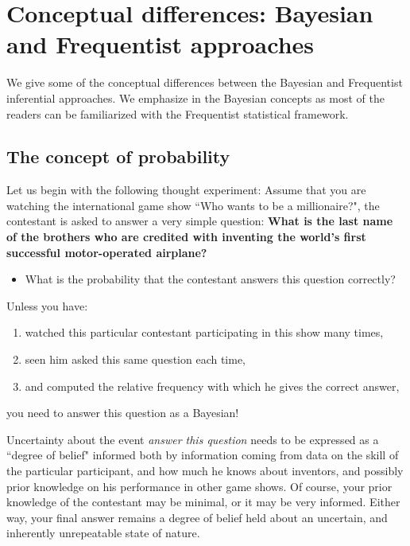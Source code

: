 \chapter{Conceptual differences: Bayesian and Frequentist approaches}\label{chap2}

We give some of the conceptual differences between the Bayesian and Frequentist inferential approaches. We emphasize in the Bayesian concepts as most of the readers can be familiarized with the Frequentist statistical framework.

\section{The concept of probability}\label{sec21}

Let us begin with the following thought experiment: Assume that you are watching the international game show ``Who wants to be a millionaire?", the contestant is asked to answer a very simple question: \textbf{What is the last name of the brothers who are credited with inventing  the world's first successful motor-operated airplane?}

\begin{itemize}
	\item What is the probability that the contestant answers this question correctly? 
\end{itemize}

Unless you have: 

\begin{enumerate}
	\item  watched this particular contestant participating in this show many times,
	\item seen him asked this same question each time, 
	\item and computed the relative frequency with which he gives the correct answer,   
\end{enumerate}
 
you need to answer this question as a Bayesian!

Uncertainty about the event \textit{answer this question} needs to be expressed as a ``degree of belief" informed both by information coming from data on the skill of the particular participant, and how much he knows about inventors, and possibly prior knowledge on his performance in other game shows. Of course, your prior knowledge of the contestant may be minimal, or it may be very informed. Either way, your final answer remains a degree of belief held about an uncertain, and inherently unrepeatable state of nature.

